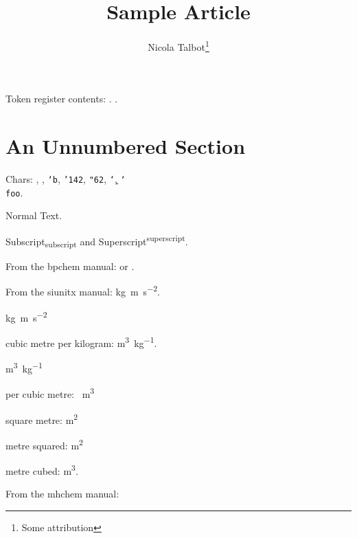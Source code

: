\documentclass{article}
\title{Sample Article}
\author{Nicola Talbot\thanks{Some attribution}}
\begin{document}
 
\maketitle

\tableofcontents


\begin{abstract} \lipsum[1] 
\end{abstract} 

Token register contents: \the\mytoks. . 


\section*{An Unnumbered Section} 

Chars: , \texttt{}, \texttt{\char`b}, \texttt{\char'142}, \texttt{\char"62}, \texttt{\char`\b}, \texttt{\char`\\ foo}. 

Normal Text.  \scalebox{2}{Scaled Text} 

\lipsum[4-5] 

Subscript\textsubscript{subscript} and Superscript\textsuperscript{superscript}. 

From the bpchem manual:  or . 

\bpalpha \bpbeta \bpDelta\HNMR \CNMR \cis \trans {} 

From the siunitx manual: \si{\kilo\gram\metre\per\square\second}. 

\si{kg.m.s^{-2}} 

cubic metre per kilogram: \si{\cubic\metre\per\kilogram}. 

\si{m^{3}.kg^{-1}} 

per cubic metre: \si{\per\cubic\metre} 

square metre: \si{\square\metre} 

metre squared: \si{\metre\squared} 

metre cubed: \si{\metre\cubed}. 

From the mhchem manual: 





\end{document}
